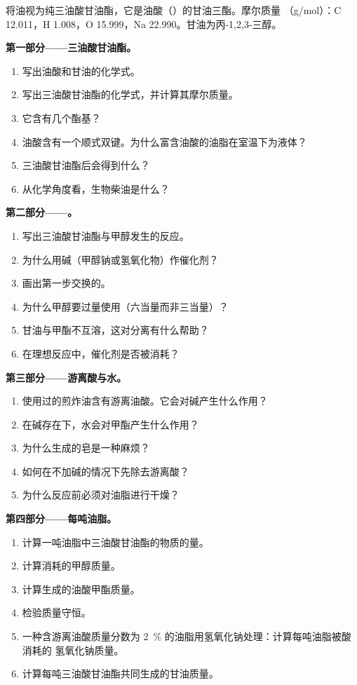 \begin{problem}
\label{pb:b2:acyl-substitution:1}
将油视为纯三油酸甘油酯，它是油酸（）的甘油三酯。摩尔质量
（\unit{g/mol}）：C 12.011，H 1.008，O 15.999，Na 22.990。甘油为丙-1,2,3-三醇。

\medskip
\noindent\textbf{第一部分——三油酸甘油酯。}
\begin{enumerate}
  \item 写出油酸和甘油的化学式。
  \item 写出三油酸甘油酯的化学式，并计算其摩尔质量。
  \item 它含有几个酯基？
  \item 油酸含有一个顺式双键。为什么富含油酸的油脂在室温下为液体？
  \item 三油酸甘油酯后会得到什么？
  \item 从化学角度看，生物柴油是什么？
\end{enumerate}

\medskip
\noindent\textbf{第二部分——。}
\begin{enumerate}[resume]
  \item 写出三油酸甘油酯与甲醇发生的反应。
  \item 为什么用碱（甲醇钠或氢氧化物）作催化剂？
  \item 画出第一步交换的。
  \item 为什么甲醇要过量使用（六当量而非三当量）？
  \item 甘油与甲酯不互溶，这对分离有什么帮助？
  \item 在理想反应中，催化剂是否被消耗？
\end{enumerate}

\medskip
\noindent\textbf{第三部分——游离酸与水。}
\begin{enumerate}[resume]
  \item 使用过的煎炸油含有游离油酸。它会对碱产生什么作用？
  \item 在碱存在下，水会对甲酯产生什么作用？
  \item 为什么生成的皂是一种麻烦？
  \item 如何在不加碱的情况下先除去游离酸？
  \item 为什么反应前必须对油脂进行干燥？
\end{enumerate}

\medskip
\noindent\textbf{第四部分——每吨油脂。}
\begin{enumerate}[resume]
  \item 计算一吨油脂中三油酸甘油酯的物质的量。
  \item 计算消耗的甲醇质量。
  \item 计算生成的油酸甲酯质量。
  \item 检验质量守恒。
  \item 一种含游离油酸质量分数为 2~\% 的油脂用氢氧化钠处理：计算每吨油脂被酸消耗的
        氢氧化钠质量。
  \item 计算每吨三油酸甘油酯共同生成的甘油质量。
\end{enumerate}
\end{problem}
